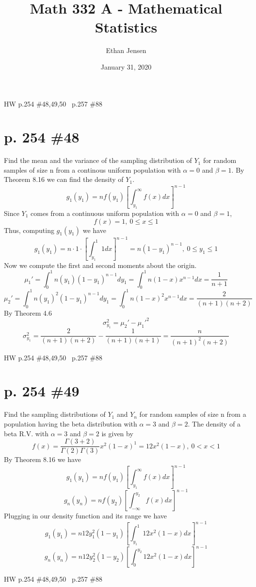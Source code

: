 \documentclass[12pt]{article}
\title{Math 332 A - Mathematical Statistics}
\author{Ethan Jensen}
\date{January 31, 2020}
\begin{document}
	\maketitle HW p.254 \#48,49,50 \ p.257 \#88
	\section[20pt]{p. 254 \#48}
	Find the mean and the variance of the sampling distribution of \(Y_1\) for random samples of size n from a continous uniform population with \(\alpha=0\) and \(\beta=1\).
	\newline \newline
	By Theorem 8.16 we can find the density of \(Y_{1}\).
	\[g_1(y_1)=nf(y_1)\left[\int_{y_1}^{\infty}f(x)dx\right]^{n-1}\]
	Since \(Y_1\) comes from a continuous uniform population with \(\alpha=0\) and \(\beta=1\),
	\[f(x)=1,\ 0\leq x \leq 1\]
	Thus, computing \(g_1(y_1)\) we have
	\[g_1(y_1)=n\cdot 1 \cdot \left[\int_{y_1}^{1}1dx\right]^{n-1}=n(1-y_1)^{n-1},\ 0 \leq y_1 \leq 1\]
	Now we compute the first and second moments about the origin.
	\[\mu_1'=\int_0^1n(y_1)(1-y_1)^{n-1}dy_1=\int_0^1n(1-x)x^{n-1}dx=\frac{1}{n+1}\]
	\[\mu_2'=\int_0^1n(y_1)^2(1-y_1)^{n-1}dy_1=\int_0^1n(1-x)^2x^{n-1}dx=\frac{2}{(n+1)(n+2)}\]
	By Theorem 4.6
	\[\sigma^2_{y_1}=\mu_2'-{\mu_1'}^2\]
	\[\sigma^2_{y_1}=\frac{2}{(n+1)(n+2)}-\frac{1}{(n+1)(n+1)}=\frac{n}{(n+1)^2(n+2)}\]
\newpage
	\maketitle HW p.254 \#48,49,50 \ p.257 \#88
	\section[20pt]{p. 254 \#49}
	Find the sampling distributions of \(Y_1\) and \(Y_n\) for random samples of size n from a population having the beta distribution with \(\alpha=3\) and \(\beta=2\).
	\newline \newline
	The density of a beta R.V. with \(\alpha=3\) and \(\beta=2\) is given by
	\[f(x)=\frac{\Gamma(3+2)}{\Gamma(2)\Gamma(3)}x^2(1-x)^1=12x^2(1-x),\ 0<x<1\]
	By Theorem 8.16 we have
	\[g_1(y_1)=nf(y_1)\left[\int_{y_1}^{\infty}f(x)dx\right]^{n-1}\]
	\[g_n(y_n)=nf(y_2)\left[\int_{-\infty}^{y_2}f(x)dx\right]^{n-1}\]
	Plugging in our density function and its range we have
	\[g_1(y_1)=n12y_1^2(1-y_1)\left[\int_{y_1}^{1}12x^2(1-x)dx\right]^{n-1}\]
	\[g_n(y_n)=n12y_2^2(1-y_2)\left[\int_{0}^{y_2}12x^2(1-x)dx\right]^{n-1}\]
\newpage
	\maketitle HW p.254 \#48,49,50 \ p.257 \#88
\end{document}
